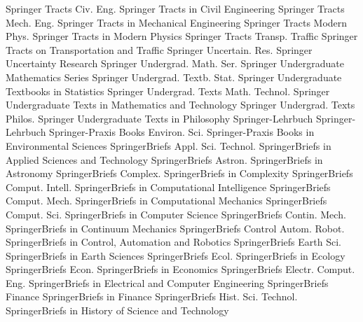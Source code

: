 {Springer Tracts Civ. Eng.}
{Springer Tracts in Civil Engineering}
{Springer Tracts Mech. Eng.}
{Springer Tracts in Mechanical Engineering}
{Springer Tracts Modern Phys.}
{Springer Tracts in Modern Physics}
{Springer Tracts Transp. Traffic}
{Springer Tracts on Transportation and Traffic}
{Springer Uncertain. Res.}
{Springer Uncertainty Research}
{Springer Undergrad. Math. Ser.}
{Springer Undergraduate Mathematics Series}
{Springer Undergrad. Textb. Stat.}
{Springer Undergraduate Textbooks in Statistics}
{Springer Undergrad. Texts Math. Technol.}
{Springer Undergraduate Texts in Mathematics and Technology}
{Springer Undergrad. Texts Philos.}
{Springer Undergraduate Texts in Philosophy}
{Springer-Lehrbuch}
{Springer-Lehrbuch}
{Springer-Praxis Books Environ. Sci.}
{Springer-Praxis Books in Environmental Sciences}
{SpringerBriefs Appl. Sci. Technol.}
{SpringerBriefs in Applied Sciences and Technology}
{SpringerBriefs Astron.}
{SpringerBriefs in Astronomy}
{SpringerBriefs Complex.}
{SpringerBriefs in Complexity}
{SpringerBriefs Comput. Intell.}
{SpringerBriefs in Computational Intelligence}
{SpringerBriefs Comput. Mech.}
{SpringerBriefs in Computational Mechanics}
{SpringerBriefs Comput. Sci.}
{SpringerBriefs in Computer Science}
{SpringerBriefs Contin. Mech.}
{SpringerBriefs in Continuum Mechanics}
{SpringerBriefs Control Autom. Robot.}
{SpringerBriefs in Control, Automation and Robotics}
{SpringerBriefs Earth Sci.}
{SpringerBriefs in Earth Sciences}
{SpringerBriefs Ecol.}
{SpringerBriefs in Ecology}
{SpringerBriefs Econ.}
{SpringerBriefs in Economics}
{SpringerBriefs Electr. Comput. Eng.}
{SpringerBriefs in Electrical and Computer Engineering}
{SpringerBriefs Finance}
{SpringerBriefs in Finance}
{SpringerBriefs Hist. Sci. Technol.}
{SpringerBriefs in History of Science and Technology}
